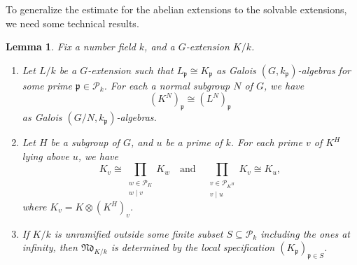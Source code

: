 \documentclass[12pt,a4paper]{amsart}
\numberwithin{equation}{section}%
\theoremstyle{plain}%
\newtheorem{lemma}[theorem]{Lemma}%
\theoremstyle{definition}%
\theoremstyle{remark}%
\begin{document}
	To generalize the estimate for the abelian extensions to the solvable extensions, we need some technical results.
	\begin{lemma}\label{lemma: local specification in field extensions}
		Fix a number field $k$, and a $G$-extension $K/k$.
		\begin{enumerate}
			\item Let $L/k$ be a $G$-extension such that $L_{\mathfrak{p}}\cong K_{\mathfrak{p}}$ as Galois $(G,k_{\mathfrak{p}})$-algebras for some prime $\mathfrak{p}\in\mathcal{P}_k$.
			For each a normal subgroup $N$ of $G$, we have
			\begin{equation*}
				(K^N)_{\mathfrak{p}}\cong (L^N)_{\mathfrak{p}}
			\end{equation*}
			as Galois $(G/N,k_{\mathfrak{p}})$-algebras.
			\item Let $H$ be a subgroup of $G$, and $u$ be a prime of $k$.
			For each prime $v$ of $K^H$ lying above $u$, we have
			\begin{equation*}
				K_{v}\cong
				\prod_{
				\substack{
					w\in\mathcal{P}_K\\
					w\mid v
				}}K_{w}
				\quad\text{and}\quad
				\prod_{
					\substack{
						v\in\mathcal{P}_{K^H}\\
						v\mid u
					}
				}K_{v}\cong K_{u},
			\end{equation*}
			where $K_{v}=K\otimes(K^H)_{v}$.
			\item If $K/k$ is unramified outside some finite subset $S\subseteq\mathcal{P}_k$ including the ones at infinity, then $\mathfrak{Nd}_{K/k}$ is determined by the local specification $(K_{\mathfrak{p}})_{\mathfrak{p}\in S}$.
		\end{enumerate}		
	\end{lemma}
\end{document}
